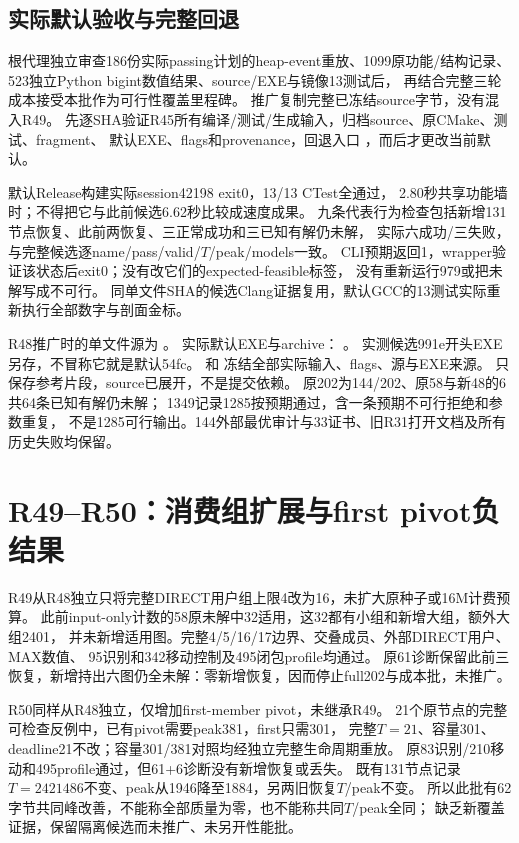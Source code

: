 \documentclass[UTF8,fontset=fandol,11pt]{ctexart}
\begin{document}
\subsection{实际默认验收与完整回退}
根代理独立审查186份实际passing计划的heap-event重放、1099原功能/结构记录、
523独立Python bigint数值结果、source/EXE与镜像13测试后，
再结合完整三轮成本接受本批作为可行性覆盖里程碑。
推广复制完整已冻结source字节，没有混入R49。
先逐SHA验证R45所有编译/测试/生成输入，归档source、原CMake、测试、fragment、
默认EXE、flags和provenance，回退入口
，而后才更改当前默认。

默认Release构建实际session42198 exit0，13/13 CTest全通过，
2.80秒共享功能墙时；不得把它与此前候选6.62秒比较成速度成果。
九条代表行为检查包括新增131节点恢复、此前两恢复、三正常成功和三已知有解仍未解，
实际六成功/三失败，与完整候选逐name/pass/valid/$T$/peak/models一致。
CLI预期返回1，wrapper验证该状态后exit0；没有改它们的expected-feasible标签，
没有重新运行979或把未解写成不可行。
同单文件SHA的候选Clang证据复用，默认GCC的13测试实际重新执行全部数字与剖面金标。

R48推广时的单文件源为
。
实际默认EXE与archive：
。
实测候选991e开头EXE另存，不冒称它就是默认54fc。
和
冻结全部实际输入、flags、源与EXE来源。
只保存参考片段，source已展开，不是提交依赖。
原202为144/202、原58与新48的6共64条已知有解仍未解；
1349记录1285按预期通过，含一条预期不可行拒绝和参数重复，
不是1285可行输出。144外部最优审计与33证书、旧R31打开文档及所有历史失败均保留。

\section{R49--R50：消费组扩展与first pivot负结果}
R49从R48独立只将完整DIRECT用户组上限4改为16，未扩大原种子或16M计费预算。
此前input-only计数的58原未解中32适用，这32都有小组和新增大组，额外大组2401，
并未新增适用图。完整4/5/16/17边界、交叠成员、外部DIRECT用户、MAX数值、
95识别和342移动控制及495闭包profile均通过。
原61诊断保留此前三恢复，新增持出六图仍全未解：零新增恢复，因而停止full202与成本批，未推广。

R50同样从R48独立，仅增加first-member pivot，未继承R49。
21个原节点的完整可检查反例中，已有pivot需要peak381，first只需301，
完整$T=21$、容量301、deadline21不改；容量301/381对照均经独立完整生命周期重放。
原83识别/210移动和495profile通过，但61+6诊断没有新增恢复或丢失。
既有131节点记录$T=2421486$不变、peak从1946降至1884，另两旧恢复$T$/peak不变。
所以此批有62字节共同峰改善，不能称全部质量为零，也不能称共同$T$/peak全同；
缺乏新覆盖证据，保留隔离候选而未推广、未另开性能批。
\end{document}
